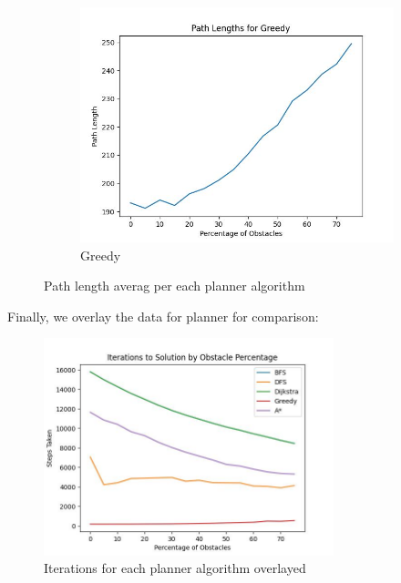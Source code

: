 \documentclass{article}
\begin{document}
\begin{figure}[H]
\begin{subfigure}{0.325\textwidth}
        \includegraphics[width = \textwidth]{plots/Greedy_paths.jpg}
        \caption{Greedy}
    \end{subfigure}
    \caption{Path length averag per each planner algorithm}
    \label{fig:paths-per-planner}
\end{figure}

Finally, we overlay the data for planner for comparison:

\begin{figure}[H]
    \centering
    \includegraphics[width = 0.75\textwidth]{plots/steps_taken.jpg}
    \caption{Iterations for each planner algorithm overlayed}
    \label{fig:iterations-all}
\end{figure}
\end{document}

